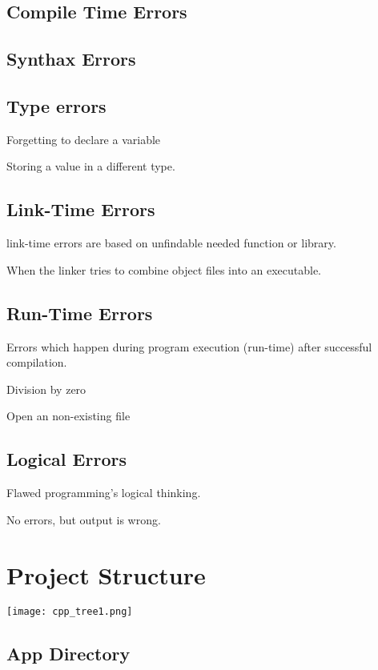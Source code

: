 \subsection{Compile Time Errors}

\subsection{Synthax Errors}

\subsection{Type errors}

Forgetting to declare a variable

Storing a value in a different type. 

\subsection{Link-Time Errors}

link-time errors are based on unfindable needed function or library.

When the linker tries to combine object files into an executable.

\subsection{Run-Time Errors}

Errors which happen during program execution (run-time) after successful compilation.

Division by zero

Open an non-existing file

\subsection{Logical Errors}

Flawed programming's logical thinking. 

No errors, but output is wrong. 

\section{Project Structure}

\begin{center}
    \texttt{[image: cpp\_tree1.png]}
\end{center}

\subsection{App Directory}

